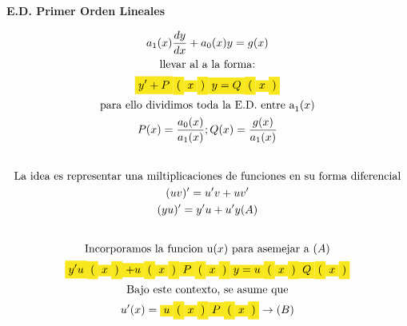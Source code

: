 \documentclass{article}
\begin{document}
\textbf{E.D. Primer Orden Lineales}




\begin{gather*}
a_{1}(x)\frac{dy}{dx}+a_{0}(x)y = g(x) \\
\text{llevar al a la forma:} \\
\text{\colorbox[RGB]{248,231,28}{$y'+P$}}\text{\colorbox[RGB]{248,231,28}{$($}}\text{\colorbox[RGB]{248,231,28}{$x$}}\text{\colorbox[RGB]{248,231,28}{$)$}}\text{\colorbox[RGB]{248,231,28}{$y = Q$}}\text{\colorbox[RGB]{248,231,28}{$($}}\text{\colorbox[RGB]{248,231,28}{$x$}}\text{\colorbox[RGB]{248,231,28}{$)$}} \\
\text{para ello dividimos toda la E.D. entre a}_{1}(x) \\
P(x) = \frac{a_{0}(x)}{a_{1}(x)}  ;  Q(x) =  \frac{g(x)}{a_{1}(x)}  \\
\vspace{0.5em} \\
\text{La idea es representar una miltiplicaciones de funciones en su forma diferencial} \\
(uv)' = u'v+uv' \\
(yu)' = y'u+u'y   (A) \\
\vspace{0.5em} \\
\text{Incorporamos la funcion u}(x)\text{ para asemejar a  }(A) \\
\text{\colorbox[RGB]{248,231,28}{$y'u$}}\text{\colorbox[RGB]{248,231,28}{$($}}\text{\colorbox[RGB]{248,231,28}{$x$}}\text{\colorbox[RGB]{248,231,28}{$)$}}\text{\colorbox[RGB]{248,231,28}{$+u$}}\text{\colorbox[RGB]{248,231,28}{$($}}\text{\colorbox[RGB]{248,231,28}{$x$}}\text{\colorbox[RGB]{248,231,28}{$)$}}\text{\colorbox[RGB]{248,231,28}{$P$}}\text{\colorbox[RGB]{248,231,28}{$($}}\text{\colorbox[RGB]{248,231,28}{$x$}}\text{\colorbox[RGB]{248,231,28}{$)$}}\text{\colorbox[RGB]{248,231,28}{$y = u$}}\text{\colorbox[RGB]{248,231,28}{$($}}\text{\colorbox[RGB]{248,231,28}{$x$}}\text{\colorbox[RGB]{248,231,28}{$)$}}\text{\colorbox[RGB]{248,231,28}{$Q$}}\text{\colorbox[RGB]{248,231,28}{$($}}\text{\colorbox[RGB]{248,231,28}{$x$}}\text{\colorbox[RGB]{248,231,28}{$)$}} \\
\text{Bajo este contexto, se asume que} \\
u'(x) = \text{\colorbox[RGB]{248,231,28}{$u$}}\text{\colorbox[RGB]{248,231,28}{$($}}\text{\colorbox[RGB]{248,231,28}{$x$}}\text{\colorbox[RGB]{248,231,28}{$)$}}\text{\colorbox[RGB]{248,231,28}{$P$}}\text{\colorbox[RGB]{248,231,28}{$($}}\text{\colorbox[RGB]{248,231,28}{$x$}}\text{\colorbox[RGB]{248,231,28}{$)$}}    \rightarrow   (B) \\

\end{gather*}
\end{document}
